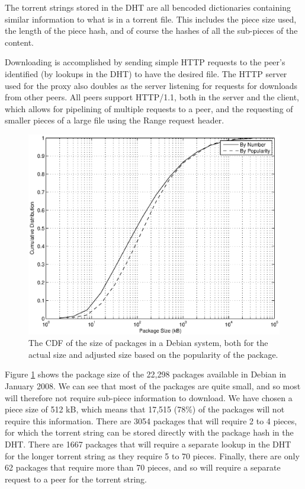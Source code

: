 \documentclass[conference]{IEEEtran}
\begin{document}
The torrent strings stored in the DHT are all bencoded dictionaries
containing similar information to what is in a torrent file. This
includes the piece size used, the length of the piece hash, and of
course the hashes of all the sub-pieces of the content.

Downloading is accomplished by sending simple HTTP requests to the
peer's identified (by lookups in the DHT) to have the desired file.
The HTTP server used for the proxy also doubles as the server
listening for requests for downloads from other peers. All peers
support HTTP/1.1, both in the server and the client, which allows
for pipelining of multiple requests to a peer, and the requesting of
smaller pieces of a large file using the Range request header.

\begin{figure}
\centering
\includegraphics[width=\columnwidth]{apt_p2p_simulation-size_CDF.eps}
\caption{The CDF of the size of packages in a Debian system, both
for the actual size and adjusted size based on the popularity of
the package.}
\label{size_CDF}
\end{figure}

Figure \ref{size_CDF} shows the package size of the 22,298 packages
available in Debian in January 2008. We can see that most of the
packages are quite small, and so most will therefore not require
sub-piece information to download. We have chosen a piece
size of 512 kB, which means that 17,515 (78\%) of the packages will
not require this information. There are 3054 packages that will
require 2 to 4 pieces, for which the torrent string can be stored
directly with the package hash in the DHT. There are 1667 packages
that will require a separate lookup in the DHT for the longer
torrent string as they require 5 to 70 pieces. Finally, there are
only 62 packages that require more than 70 pieces, and so will
require a separate request to a peer for the torrent string.
\end{document}
